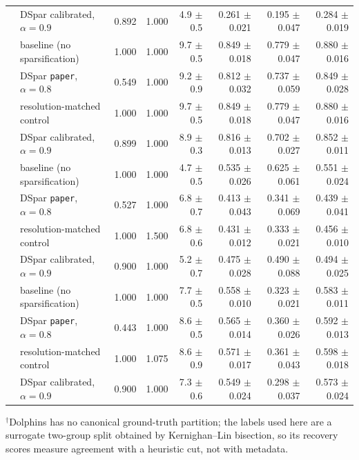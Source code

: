 \begin{table}[t]
\begin{tabular}{llrrrrrr}
 & DSpar calibrated, $\alpha=0.9$ & 0.892 & 1.000 & 4.9 $\pm$ 0.5 & 0.261 $\pm$ 0.021 & 0.195 $\pm$ 0.047 & 0.284 $\pm$ 0.019 \\
\addlinespace[2pt]
\multirow{4}{*}{Football} & baseline (no sparsification) & 1.000 & 1.000 & 9.7 $\pm$ 0.5 & 0.849 $\pm$ 0.018 & 0.779 $\pm$ 0.047 & 0.880 $\pm$ 0.016 \\
 & DSpar \texttt{paper}, $\alpha=0.8$ & 0.549 & 1.000 & 9.2 $\pm$ 0.9 & 0.812 $\pm$ 0.032 & 0.737 $\pm$ 0.059 & 0.849 $\pm$ 0.028 \\
 & resolution-matched control & 1.000 & 1.000 & 9.7 $\pm$ 0.5 & 0.849 $\pm$ 0.018 & 0.779 $\pm$ 0.047 & 0.880 $\pm$ 0.016 \\
 & DSpar calibrated, $\alpha=0.9$ & 0.899 & 1.000 & 8.9 $\pm$ 0.3 & 0.816 $\pm$ 0.013 & 0.702 $\pm$ 0.027 & 0.852 $\pm$ 0.011 \\
\addlinespace[2pt]
\multirow{4}{*}{Polbooks} & baseline (no sparsification) & 1.000 & 1.000 & 4.7 $\pm$ 0.5 & 0.535 $\pm$ 0.026 & 0.625 $\pm$ 0.061 & 0.551 $\pm$ 0.024 \\
 & DSpar \texttt{paper}, $\alpha=0.8$ & 0.527 & 1.000 & 6.8 $\pm$ 0.7 & 0.413 $\pm$ 0.043 & 0.341 $\pm$ 0.069 & 0.439 $\pm$ 0.041 \\
 & resolution-matched control & 1.000 & 1.500 & 6.8 $\pm$ 0.6 & 0.431 $\pm$ 0.012 & 0.333 $\pm$ 0.021 & 0.456 $\pm$ 0.010 \\
 & DSpar calibrated, $\alpha=0.9$ & 0.900 & 1.000 & 5.2 $\pm$ 0.7 & 0.475 $\pm$ 0.028 & 0.490 $\pm$ 0.088 & 0.494 $\pm$ 0.025 \\
\addlinespace[2pt]
\multirow{4}{*}{email-Eu-core} & baseline (no sparsification) & 1.000 & 1.000 & 7.7 $\pm$ 0.5 & 0.558 $\pm$ 0.010 & 0.323 $\pm$ 0.021 & 0.583 $\pm$ 0.011 \\
 & DSpar \texttt{paper}, $\alpha=0.8$ & 0.443 & 1.000 & 8.6 $\pm$ 0.5 & 0.565 $\pm$ 0.014 & 0.360 $\pm$ 0.026 & 0.592 $\pm$ 0.013 \\
 & resolution-matched control & 1.000 & 1.075 & 8.6 $\pm$ 0.9 & 0.571 $\pm$ 0.017 & 0.361 $\pm$ 0.043 & 0.598 $\pm$ 0.018 \\
 & DSpar calibrated, $\alpha=0.9$ & 0.900 & 1.000 & 7.3 $\pm$ 0.6 & 0.549 $\pm$ 0.024 & 0.298 $\pm$ 0.037 & 0.573 $\pm$ 0.024 \\
\bottomrule
\end{tabular}

\vspace{2pt}
{\footnotesize\raggedright $^{\dagger}$Dolphins has no canonical ground-truth partition; the labels
used here are a surrogate two-group split obtained by Kernighan--Lin bisection, so its recovery
scores measure agreement with a heuristic cut, not with metadata.\par}
\end{table}
